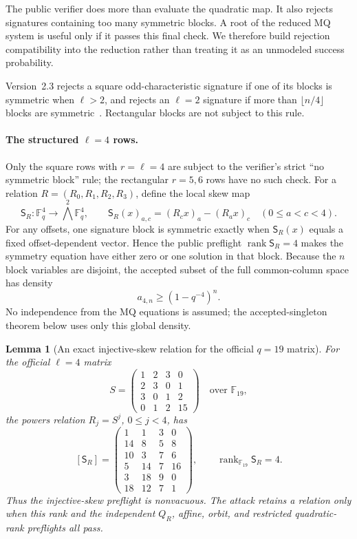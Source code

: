 \documentclass[11pt]{article}
\newtheorem{lemma}[lemma]{Lemma}
\newcommand{\F}{\mathbb F}
\newcommand{\rank}{\operatorname{rank}}
\begin{document}
The public verifier does more than evaluate the quadratic map.  It also rejects
signatures containing too many symmetric blocks.  A root of the reduced MQ
system is useful only if it passes this final check.  We therefore build
rejection compatibility into the reduction rather than treating it as an
unmodeled success probability.

Version~2.3 rejects a square odd-characteristic signature if one of its blocks
is symmetric when $\ell>2$, and rejects an $\ell=2$ signature if more than
$\lfloor n/4\rfloor$ blocks are symmetric~\cite{SNOVA23}.  Rectangular blocks
are not subject to this rule.

\paragraph{The structured $\ell=4$ rows.}
Only the square rows with $r=\ell=4$ are subject to the verifier's strict
``no symmetric block'' rule; the rectangular $r=5,6$ rows have no such check.
For a relation $R=(R_0,R_1,R_2,R_3)$, define the local skew map
\begin{equation}\label{eq:local-skew-map}
 \mathsf S_R:\F_q^4\longrightarrow\bigwedge^2\F_q^4,
 \qquad
 \mathsf S_R(x)_{a,c}=(R_cx)_a-(R_ax)_c
 \quad(0\le a<c<4).
\end{equation}
For any offsets, one signature block is symmetric exactly when
$\mathsf S_R(x)$ equals a fixed offset-dependent vector.  Hence the public
preflight $\rank\mathsf S_R=4$ makes the symmetry equation have either zero or
one solution in that block.  Because the $n$ block variables are disjoint, the
accepted subset of the full common-column space has density
\begin{equation}\label{eq:l4-accepted-density}
 a_{4,n}\ge(1-q^{-4})^n.
\end{equation}
No independence from the MQ equations is assumed; the accepted-singleton
theorem below uses only this global density.

\begin{lemma}[An exact injective-skew relation for the official $q=19$ matrix]
\label{lem:l4-skew-rank}
For the official $\ell=4$ matrix
\[
 S=\begin{pmatrix}
 1&2&3&0\\2&3&0&1\\3&0&1&2\\0&1&2&15
 \end{pmatrix}
 \quad\text{over }\F_{19},
\]
the powers relation $R_j=S^j$, $0\le j<4$, has
\[
 [\mathsf S_R]=
 \begin{pmatrix}
 1&1&3&0\\14&8&5&8\\10&3&7&6\\
 5&14&7&16\\3&18&9&0\\18&12&7&1
 \end{pmatrix},
 \qquad \rank_{\F_{19}}\mathsf S_R=4.
\]
Thus the injective-skew preflight is nonvacuous.  The attack retains a relation
only when this rank and the independent $Q_R$, affine, orbit, and restricted
quadratic-rank preflights all pass.
\end{lemma}
\end{document}
